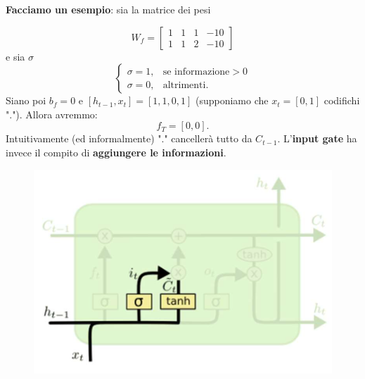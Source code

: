 \textbf{Facciamo un esempio}: sia la matrice dei pesi

\[ W_f=
\begin{bmatrix}
    1& 1& 1 & -10 \\
    1& 1& 2 & -10 
\end{bmatrix}
\]
e sia $\sigma$
\begin{equation}
   \begin{cases} 
      \sigma=1, & \text{se informazione}>0 \\ 
      \sigma=0, & \text{altrimenti}.
   \end{cases}
\end{equation}
Siano poi $b_f=0$ e $[h_{t-1},x_t]=[1,1,0,1]$ (supponiamo che $x_t=[0,1]$ codifichi "."). Allora avremmo:
\begin{equation}
   f_T=[0,0].
\end{equation}
Intuitivamente (ed informalmente) "." cancellerà tutto da $C_{t-1}$. 
\newline
L'\textbf{input gate} ha invece il compito di \textbf{aggiungere le informazioni}.
\begin{figure}[!h]
   \includegraphics[scale=.5]{images/rnn/input_gate.png}
   \centering
\end{figure}



